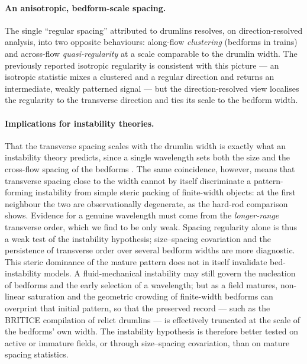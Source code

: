 \documentclass[11pt]{article}
\begin{document}
\paragraph{An anisotropic, bedform-scale spacing.}
The single ``regular spacing'' attributed to drumlins resolves, on direction-resolved analysis, into two
opposite behaviours: along-flow \emph{clustering} (bedforms in trains) and across-flow
\emph{quasi-regularity} at a scale comparable to the drumlin width. The previously reported isotropic
regularity \citep{clark2018spatial} is consistent with this picture --- an isotropic statistic mixes a
clustered and a regular direction and returns an intermediate, weakly patterned signal --- but the
direction-resolved view localises the regularity to the transverse direction and ties its scale to the
bedform width.

\paragraph{Implications for instability theories.}
That the transverse spacing scales with the drumlin width is exactly what an instability theory predicts,
since a single wavelength sets both the size and the cross-flow spacing of the bedforms
\citep{hindmarsh1998,fowler2000,fowler2014,clark2009}. The same coincidence, however, means that
transverse spacing close to the width cannot by itself discriminate a pattern-forming instability from
simple steric packing of finite-width objects: at the first neighbour the two are observationally
degenerate, as the hard-rod comparison shows. Evidence for a genuine wavelength must come from the
\emph{longer-range} transverse order, which we find to be only weak. Spacing regularity alone is thus a
weak test of the instability hypothesis; size--spacing covariation and the persistence of transverse
order over several bedform widths are more diagnostic. This steric dominance of the mature pattern does
not in itself invalidate bed-instability models. A fluid-mechanical instability may still govern the
nucleation of bedforms and the early selection of a wavelength; but as a field matures, non-linear
saturation and the geometric crowding of finite-width bedforms can overprint that initial pattern, so
that the preserved record --- such as the BRITICE compilation of relict drumlins --- is effectively
truncated at the scale of the bedforms' own width. The instability hypothesis is therefore better tested
on active or immature fields, or through size--spacing covariation, than on mature spacing statistics.
\end{document}
